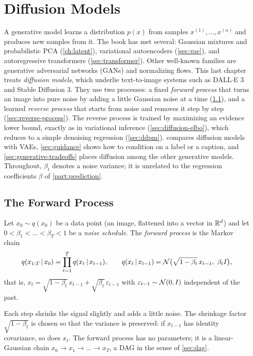 \chapter{Diffusion Models}\label{ch:diffusion}

A generative model learns a distribution $p(x)$ from samples $x^{(1)},\dots,x^{(n)}$ and produces new samples from it. The book has met several: Gaussian mixtures and probabilistic PCA (\cref{ch:latent}), variational autoencoders (\cref{sec:vae}), and autoregressive transformers (\cref{sec:transformer}). Other well-known families are generative adversarial networks (GANs) and normalizing flows. This last chapter treats \emph{diffusion models}, which underlie text-to-image systems such as DALL$\cdot$E 3 and Stable Diffusion 3. They use two processes: a fixed \emph{forward process} that turns an image into pure noise by adding a little Gaussian noise at a time (\cref{sec:forward-process}), and a learned \emph{reverse process} that starts from noise and removes it step by step (\cref{sec:reverse-process}). The reverse process is trained by maximizing an evidence lower bound, exactly as in variational inference (\cref{sec:diffusion-elbo}), which reduces to a simple denoising regression (\cref{sec:ddpm}).  compares diffusion models with VAEs, \cref{sec:guidance} shows how to condition on a label or a caption, and \cref{sec:generative-tradeoffs} places diffusion among the other generative models. Throughout, $\beta_t$ denotes a noise variance; it is unrelated to the regression coefficients $\beta$ of \cref{part:prediction}.

\section{The Forward Process}\label{sec:forward-process}

\begin{definition}\label{def:forward-process}
Let $x_0\sim q(x_0)$ be a data point (an image, flattened into a vector in $\mathbb{R}^d$) and let $0<\beta_1<\dots<\beta_T<1$ be a \emph{noise schedule}. The \emph{forward process} is the Markov chain
\[
q(x_{1:T}\,|\, x_0)=\prod_{t=1}^Tq(x_t\,|\, x_{t-1}),\qquad q(x_t\,|\, x_{t-1})=\mathcal{N}\big(\sqrt{1-\beta_t}\,x_{t-1},\ \beta_tI\big),
\]
that is, $x_t=\sqrt{1-\beta_t}\,x_{t-1}+\sqrt{\beta_t}\,\varepsilon_{t-1}$ with $\varepsilon_{t-1}\sim\mathcal{N}(0,I)$ independent of the past.
\end{definition}

Each step shrinks the signal slightly and adds a little noise. The shrinkage factor $\sqrt{1-\beta_t}$ is chosen so that the variance is preserved: if $x_{t-1}$ has identity covariance, so does $x_t$. The forward process has no parameters; it is a linear-Gaussian chain $x_0\to x_1\to\dots\to x_T$, a DAG in the sense of \cref{sec:dag}.

